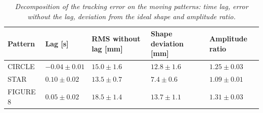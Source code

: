 \begin{table}[H]
\centering
\begin{tabularx}{\textwidth}{|l|X|X|X|X|}
\hline
\textbf{Pattern} & \textbf{Lag [s]} & \textbf{RMS without lag [mm]} & \textbf{Shape deviation [mm]} & \textbf{Amplitude ratio} \\ \hline
CIRCLE & $-0.04 \pm 0.01$ & $15.0 \pm 1.6$ & $12.8 \pm 1.6$ & $1.25 \pm 0.03$ \\ \hline
STAR & $0.10 \pm 0.02$ & $13.5 \pm 0.7$ & $7.4 \pm 0.6$ & $1.09 \pm 0.01$ \\ \hline
FIGURE 8 & $0.05 \pm 0.02$ & $18.5 \pm 1.4$ & $13.7 \pm 1.1$ & $1.31 \pm 0.03$ \\ \hline
\end{tabularx}
\caption{\textit{Decomposition of the tracking error on the moving patterns: time lag, error without the lag, deviation from the ideal shape and amplitude ratio.}}
\label{tab:lag}
\end{table}
